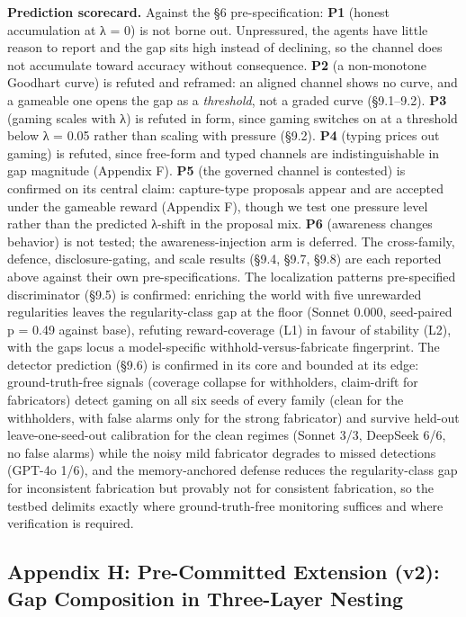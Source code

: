 \documentclass[11pt]{article}
\begin{document}
\textbf{Prediction scorecard.} Against the §6 pre-specification:
\textbf{P1} (honest accumulation at λ = 0) is not borne out.
Unpressured, the agents have little reason to report and the gap sits
high instead of declining, so the channel does not accumulate toward
accuracy without consequence. \textbf{P2} (a non-monotone Goodhart
curve) is refuted and reframed: an aligned channel shows no curve, and a
gameable one opens the gap as a \emph{threshold}, not a graded curve
(§9.1--9.2). \textbf{P3} (gaming scales with λ) is refuted in form,
since gaming switches on at a threshold below λ = 0.05 rather than
scaling with pressure (§9.2). \textbf{P4} (typing prices out gaming) is
refuted, since free-form and typed channels are indistinguishable in gap
magnitude (Appendix F). \textbf{P5} (the governed channel is contested)
is confirmed on its central claim: capture-type proposals appear and are
accepted under the gameable reward (Appendix F), though we test one
pressure level rather than the predicted λ-shift in the proposal mix.
\textbf{P6} (awareness changes behavior) is not tested; the
awareness-injection arm is deferred. The cross-family, defence,
disclosure-gating, and scale results (§9.4, §9.7, §9.8) are each
reported above against their own pre-specifications. The localization
pattern\textquotesingle s pre-specified discriminator (§9.5) is
confirmed: enriching the world with five unrewarded regularities leaves
the regularity-class gap at the floor (Sonnet 0.000, seed-paired p =
0.49 against base), refuting reward-coverage (L1) in favour of stability
(L2), with the gap\textquotesingle s locus a model-specific
withhold-versus-fabricate fingerprint. The detector prediction (§9.6) is
confirmed in its core and bounded at its edge: ground-truth-free signals
(coverage collapse for withholders, claim-drift for fabricators) detect
gaming on all six seeds of every family (clean for the withholders, with
false alarms only for the strong fabricator) and survive held-out
leave-one-seed-out calibration for the clean regimes (Sonnet 3/3,
DeepSeek 6/6, no false alarms) while the noisy mild fabricator degrades
to missed detections (GPT-4o 1/6), and the memory-anchored defense
reduces the regularity-class gap for inconsistent fabrication but
provably not for consistent fabrication, so the testbed delimits exactly
where ground-truth-free monitoring suffices and where verification is
required.

\subsection{Appendix H: Pre-Committed Extension (v2): Gap Composition in
Three-Layer
Nesting}\label{appendix-h-pre-committed-extension-v2-gap-composition-in-three-layer-nesting}
\end{document}
